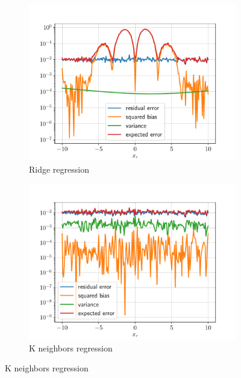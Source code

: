 \begin{figure}[H]
    \centering
    \begin{subfigure}{0.495\textwidth}
        \includegraphics[width=\textwidth]{resources/pdf/Q3d_Ridge.pdf}
        \caption{Ridge regression}
        \label{fig:Q3d_ridge}
    \end{subfigure}
    \begin{subfigure}{0.495\textwidth}
        \includegraphics[width=\textwidth]{resources/pdf/Q3d_KNeighborsRegressor.pdf}
        \caption{K neighbors regression}
        \label{fig:Q3d_kneighborsregressor}
    \end{subfigure}
    \label{fig:Q3d_error}
\end{figure}
